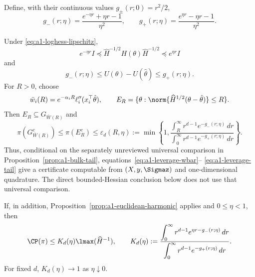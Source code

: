 \documentclass[../../main.tex]{subfiles}
\begin{document}
Define, with their continuous values $g_\pm(r;0)=r^2/2$,
\begin{equation}\label{eq:a1-gpm}
 g_-(r;\eta)=\frac{e^{-\eta r}+\eta r-1}{\eta^2},
 \qquad
 g_+(r;\eta)=\frac{e^{\eta r}-\eta r-1}{\eta^2}.
\end{equation}
\begin{proposition}
\label{prop:a1-mode-leverage}
Under \eqref{eq:a1-loghess-lipschitz},
\begin{equation}\label{eq:a1-hessian-sandwich}
 e^{-\eta r}I\preceq
 \widehat H^{-1/2}H(\theta)\widehat H^{-1/2}
 \preceq e^{\eta r}I
\end{equation}
and
\begin{equation}\label{eq:a1-potential-sandwich}
 g_-(r;\eta)\le U(\theta)-U(\hat\theta)\le g_+(r;\eta).
\end{equation}
For $R>0$, choose
\begin{equation}\label{eq:a1-leverage-wbar}
 \bar w_i(R)=e^{-\alpha_iR}\ell_i''(x_i^\top\hat\theta),
 \qquad E_R=\{\theta:\norm{\widehat H^{1/2}(\theta-\hat\theta)}\le R\}.
\end{equation}
Then $E_R\subseteq G_{\bar W(R)}$ and
\begin{equation}\label{eq:a1-leverage-tail}
 \pi(G_{\bar W(R)}^c)\le\pi(E_R^c)\le
 \varepsilon_d(R,\eta):=\min\!\left\{1,
 \frac{\displaystyle\int_R^\infty r^{d-1}e^{-g_-(r;\eta)}\,dr}
      {\displaystyle\int_0^\infty r^{d-1}e^{-g_+(r;\eta)}\,dr}\right\}.
\end{equation}
Thus, conditional on the separately unreviewed universal comparison in
Proposition~\ref{prop:a1-bulk-tail}, equations~\eqref{eq:a1-leverage-wbar}--
\eqref{eq:a1-leverage-tail} give a certificate computable from $(X,y,\Sigmaz)$ and
one-dimensional quadrature. The direct bounded-Hessian conclusion below does not use that
universal comparison.

If, in addition, Proposition~\ref{prop:a1-euclidean-harmonic} applies and $0\le\eta<1$, then
\begin{equation}\label{eq:a1-leverage-direct}
 \CP(\pi)\le K_d(\eta)\lmax(\widehat H^{-1}),
 \qquad
 K_d(\eta):=
 \frac{\displaystyle\int_0^\infty r^{d-1}e^{\eta r-g_-(r;\eta)}\,dr}
      {\displaystyle\int_0^\infty r^{d-1}e^{-g_+(r;\eta)}\,dr}.
\end{equation}
For fixed $d$, $K_d(\eta)\to1$ as $\eta\downarrow0$.
\end{proposition}
\end{document}
